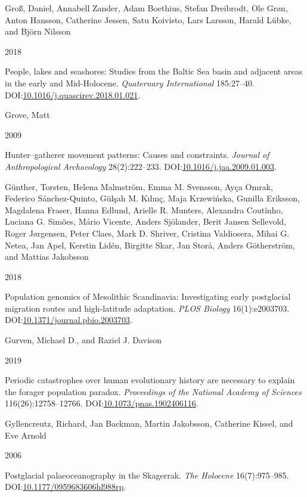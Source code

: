 \documentclass[
  12pt,
  a4paper,
  oneside]{book}
\newlength{\cslhangindent}
\newlength{\csllabelwidth}
\newlength{\cslentryspacingunit} %
\newenvironment{CSLReferences}[2] %
 {%
  \setlength{\parindent}{0pt}
  \ifodd #1
  \let\oldpar\par
  \def\par{\hangindent=\cslhangindent\oldpar}
  \fi
  \setlength{\parskip}{#2\cslentryspacingunit}
 }%
 {}
\newcommand{\CSLBlock}[1]{#1\hfill\break}
\newcommand{\CSLLeftMargin}[1]{\parbox[t]{\csllabelwidth}{#1}}
\newcommand{\CSLRightInline}[1]{\parbox[t]{\linewidth - \csllabelwidth}{#1}\break}
\begin{document}
\begin{CSLReferences}{0}{0}
\leavevmode{}%
\CSLBlock{Groß, Daniel, Annabell Zander, Adam Boethius, Stefan Dreibrodt, Ole Grøn, Anton Hansson, Catherine Jessen, Satu Koivisto, Lars Larsson, Harald Lübke, and Björn Nilsson}
\CSLLeftMargin{ 2018}%
\CSLRightInline{People, lakes and seashores: Studies from the Baltic Sea basin and adjacent areas in the early and Mid-Holocene. \emph{Quaternary International} 185:27--40. DOI:\href{https://doi.org/10.1016/j.quascirev.2018.01.021}{10.1016/j.quascirev.2018.01.021}.}

\leavevmode{}%
\CSLBlock{Grove, Matt}
\CSLLeftMargin{ 2009}%
\CSLRightInline{{Hunter--gatherer movement patterns: Causes and constraints}. \emph{Journal of Anthropological Archaeology} 28(2):222--233. DOI:\href{https://doi.org/10.1016/j.jaa.2009.01.003}{10.1016/j.jaa.2009.01.003}.}

\leavevmode{}%
\CSLBlock{Günther, Torsten, Helena Malmström, Emma M. Svensson, Ayça Omrak, Federico Sánchez-Quinto, Gülşah M. Kılınç, Maja Krzewińska, Gunilla Eriksson, Magdalena Fraser, Hanna Edlund, Arielle R. Munters, Alexandra Coutinho, Luciana G. Simões, Mário Vicente, Anders Sjölander, Berit Jansen Sellevold, Roger Jørgensen, Peter Claes, Mark D. Shriver, Cristina Valdiosera, Mihai G. Netea, Jan Apel, Kerstin Lidén, Birgitte Skar, Jan Storå, Anders Götherström, and Mattias Jakobsson}
\CSLLeftMargin{ 2018}%
\CSLRightInline{Population genomics of Mesolithic Scandinavia: Investigating early postglacial migration routes and high-latitude adaptation. \emph{PLOS Biology} 16(1):e2003703. DOI:\href{https://doi.org/10.1371/journal.pbio.2003703}{10.1371/journal.pbio.2003703}.}

\leavevmode{}%
\CSLBlock{Gurven, Michael D., and Raziel J. Davison}
\CSLLeftMargin{ 2019}%
\CSLRightInline{Periodic catastrophes over human evolutionary history are necessary to explain the forager population paradox. \emph{Proceedings of the National Academy of Sciences} 116(26):12758--12766. DOI:\href{https://doi.org/10.1073/pnas.1902406116}{10.1073/pnas.1902406116}.}

\leavevmode{}%
\CSLBlock{Gyllencreutz, Richard, Jan Backman, Martin Jakobsson, Catherine Kissel, and Eve Arnold}
\CSLLeftMargin{ 2006}%
\CSLRightInline{{Postglacial palaeoceanography in the Skagerrak}. \emph{The Holocene} 16(7):975--985. DOI:\href{https://doi.org/10.1177/0959683606hl988rp}{10.1177/0959683606hl988rp}.}


\end{CSLReferences}
\end{document}
